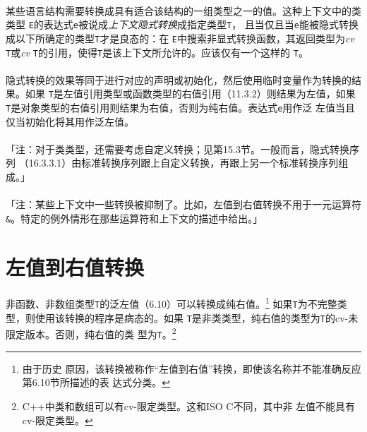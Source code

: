 \paragraph{}
某些语言结构需要转换成具有适合该结构的一组类型之一的值。这种上下文中的类类型
\texttt{E}的表达式\texttt{e}被说成\textit{上下文隐式转换}成指定类型\texttt{T}，
且当仅且当\texttt{e}能被隐式转换成以下所确定的类型\texttt{T}才是良态的：在
\texttt{E}中搜索非显式转换函数，其返回类型为\textit{cv} \texttt{T}或\textit{cv}
\texttt{T}的引用，使得\texttt{T}是该上下文所允许的。应该仅有一个这样的
\texttt{T}。

\paragraph{}
隐式转换的效果等同于进行对应的声明或初始化，然后使用临时变量作为转换的结果。如果
\texttt{T}是左值引用类型或函数类型的右值引用（11.3.2）则结果为左值，如果
\texttt{T}是对象类型的右值引用则结果为右值，否则为纯右值。表达式\texttt{e}用作泛
左值当且仅当初始化将其用作泛左值。

\paragraph{}
「注：对于类类型，还需要考虑自定义转换；见第15.3节。一般而言，隐式转换序列
（16.3.3.1）由标准转换序列跟上自定义转换，再跟上另一个标准转换序列组成。」

\paragraph{}
「注：某些上下文中一些转换被抑制了。比如，左值到右值转换不用于一元运算符
\texttt{\&}。特定的例外情形在那些运算符和上下文的描述中给出。」

\section{左值到右值转换}
\paragraph{}
非函数、非数组类型\texttt{T}的泛左值（6.10）可以转换成纯右值。\footnote{由于历史
原因，该转换被称作``左值到右值''转换，即使该名称并不能准确反应第6.10节所描述的表
达式分类。} 如果\texttt{T}为不完整类型，则使用该转换的程序是病态的。如果
\texttt{T}是非类类型，纯右值的类型为\texttt{T}的cv-未限定版本。否则，纯右值的类
型为\texttt{T}。\footnote{C++中类和数组可以有cv-限定类型。这和ISO C不同，其中非
左值不能具有cv-限定类型。}

